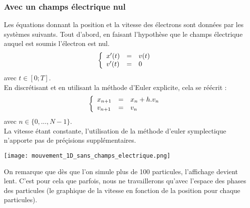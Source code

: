 \documentclass{article}
\begin{document}
\subsubsection{Avec un champs électrique nul}
Les équations donnant la position et la vitesse des électrons sont données par les systèmes suivants. Tout d'abord, en faisant l'hypothèse que le champs électrique auquel est soumis l'électron est nul.
$$
\left \{
   \begin{array}{l l l}
      x'(t)  & = & v(t) \\
      v'(t)  & = & 0 \\
	\end{array}
\right.
$$
avec $t \in [0;T]$.\\
En discrétisant et en utilisant la méthode d'Euler explicite, cela se réécrit :
$$
\left \{
   \begin{array}{l l l}
      x_{n+1}  & = & x_n + h.v_n \\
      v_{n+1}  & = & v_n \\
	\end{array}
\right.
$$
avec $n \in \{0,...,N-1\}$.\\
La vitesse étant constante, l'utilisation de la méthode d'euler symplectique n'apporte pas de préçisions supplémentaires.\\
\begin{center}
\texttt{[image: mouvement\_1D\_sans\_champs\_electrique.png]}
\end{center}
On remarque que dès que l'on simule plus de 100 particules, l'affichage devient lent. C'est pour cela que parfois, nous ne travaillerons qu'avec l'espace des phases des particules (le graphique de la vitesse en fonction de la position pour chaque particules).
\end{document}
